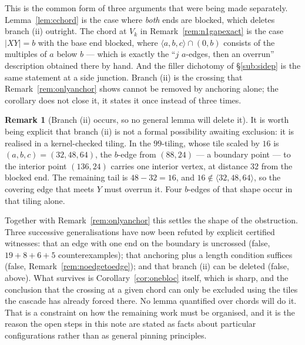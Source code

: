 \documentclass[11pt,reqno]{amsart}
\theoremstyle{plain}
\theoremstyle{definition}
\newtheorem{remark}[theorem]{Remark}
\begin{document}
This is the common form of three arguments that were being made separately. Lemma~\ref{lem:cchord} is
the case where \emph{both} ends are blocked, which deletes branch (ii) outright. The chord at $V_k$
in Remark~\ref{rem:n1gapexact} is the case $|XY|=b$ with the base end blocked, where
$\langle a,b,c\rangle\cap(0,b)$ consists of the multiples of $a$ below $b$ --- which is exactly the
``$j$ $a$-edges, then an overrun'' description obtained there by hand. And the filler dichotomy of
\S\ref{sub:sidep} is the same statement at a side junction. Branch (ii) is the crossing that
Remark~\ref{rem:onlyanchor} shows cannot be removed by anchoring alone; the corollary does not close
it, it states it once instead of three times.

\begin{remark}[Branch \textup{(ii)} occurs, so no general lemma will delete it]\label{rem:branchii}
It is worth being explicit that branch (ii) is not a formal possibility awaiting exclusion: it is
realised in a kernel-checked tiling. In the $99$-tiling, whose tile scaled by $16$ is
$(a,b,c)=(32,48,64)$, the $b$-edge from $(88,24)$ --- a boundary point --- to the interior point
$(136,24)$ carries one interior vertex, at distance $32$ from the blocked end. The remaining tail is
$48-32=16$, and $16\notin\langle32,48,64\rangle$, so the covering edge that meets $Y$ must overrun
it. Four $b$-edges of that shape occur in that tiling alone.

Together with Remark~\ref{rem:onlyanchor} this settles the shape of the obstruction. Three successive
generalisations have now been refuted by explicit certified witnesses: that an edge with one end on
the boundary is uncrossed (false, $19+8+6+5$ counterexamples); that anchoring plus a length condition
suffices (false, Remark~\ref{rem:noedgetoedge}); and that branch (ii) can be deleted (false, above).
What survives is Corollary~\ref{cor:onebloc} itself, which is sharp, and the conclusion that the
crossing at a given chord can only be excluded using the tiles the cascade has already forced there.
No lemma quantified over chords will do it. That is a constraint on how the remaining work must be
organised, and it is the reason the open steps in this note are stated as facts about particular
configurations rather than as general pinning principles.
\end{remark}
\end{document}
